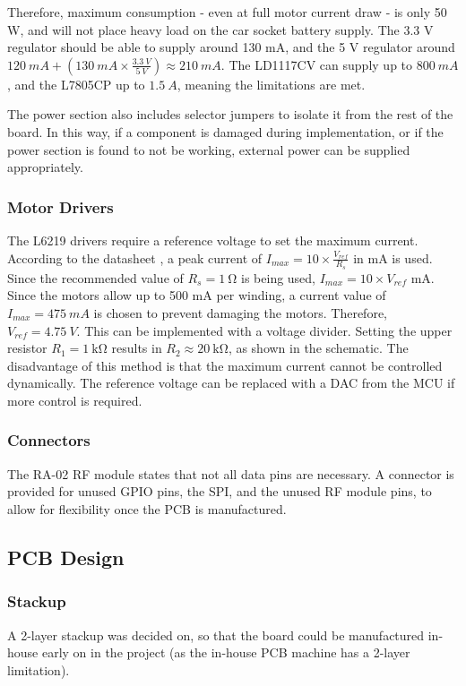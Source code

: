 Therefore, maximum consumption - even at full motor current draw - is only 50 W, and will not place heavy load on the car socket battery supply. The 3.3 V regulator should be able to supply around 130 mA, and the 5 V regulator around $\SI{120}{mA} + (\SI{130}{mA} \times \frac{\SI{3.3}{V}}{\SI{5}{V}}) \approx \SI{210}{mA}$. The LD1117CV can supply up to $\SI{800}{mA}$, and the L7805CP up to $\SI{1.5}{A}$, meaning the limitations are met.

The power section also includes selector jumpers to isolate it from the rest of the board. In this way, if a component is damaged during implementation, or if the power section is found to not be working, external power can be supplied appropriately.

\subsubsection{Motor Drivers}
The L6219 drivers require a reference voltage to set the maximum current. According to the datasheet \cite{datasheet-L6219}, a peak current of $I_{max} = 10 \times \frac{V_{ref}}{R_s}$ in mA is used. Since the recommended value of $R_s = \SI{1}{\ohm}$ is being used, $I_{max} = 10 \times V_{ref}$ mA. Since the motors allow up to 500 mA per winding, a current value of $I_{max} = \SI{475}{mA}$ is chosen to prevent damaging the motors. Therefore, $V_{ref} = \SI{4.75}{V}$. This can be implemented with a voltage divider. Setting the upper resistor $R_1 = \SI{1}{\kilo \ohm}$ results in $R_2 \approx \SI{20}{\kilo \ohm}$, as shown in the schematic. The disadvantage of this method is that the maximum current cannot be controlled dynamically. The reference voltage can be replaced with a DAC from the MCU if more control is required.

\subsubsection{Connectors}
The RA-02 RF module states that not all data pins are necessary. A connector is provided for unused GPIO pins, the SPI, and the unused RF module pins, to allow for flexibility once the PCB is manufactured.

\subsection{PCB Design}
\subsubsection{Stackup}
A 2-layer stackup was decided on, so that the board could be manufactured in-house early on in the project (as the in-house PCB machine has a 2-layer limitation).

